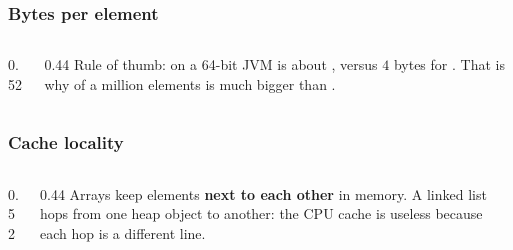 \documentclass[aspectratio=169,10pt,compress]{beamer}
\begin{document}
\begin{frame}[t,fragile] \frametitle{Bytes per element}
  \begin{columns}[T]
    \begin{column}{0.52\textwidth}
    \end{column}
    \begin{column}{0.44\textwidth}
      \small
      Rule of thumb:  on a 64-bit JVM is
      about , versus $4$ bytes for .
      That is why  of a million elements
      is much bigger than .
    \end{column}
  \end{columns}
\end{frame}




\begin{frame}[t,fragile] \frametitle{Cache locality}
  \begin{columns}[T]
    \begin{column}{0.52\textwidth}
    \end{column}
    \begin{column}{0.44\textwidth}
      \small
      Arrays keep elements \textbf{next to each other} in memory.
      A linked list hops from one heap object to another:
      the CPU cache is useless because each hop is a different line.
    \end{column}
  \end{columns}
\end{frame}

\end{document}
